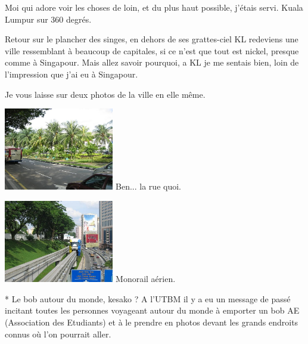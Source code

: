 \begin{multicols}{2}
Moi qui adore voir les choses de loin, et du plus haut possible, j'étais servi. Kuala Lumpur sur 360 degrés.

Retour sur le plancher des singes, en dehors de ses grattes-ciel KL redeviens une ville ressemblant à beaucoup de capitales, si ce n'est que tout est nickel, presque comme à Singapour. Mais allez savoir pourquoi, a KL je me sentais bien, loin de l'impression que j'ai eu à Singapour.

Je vous laisse sur deux photos de la ville en elle même.

\hspace*{-0.65cm}
\includegraphics[width=4.8cm]{articles/Kuala-lumpur/1211016874hbIL.jpg}
Ben... la rue quoi.

\hspace*{-0.65cm}
\includegraphics[width=4.8cm]{articles/Kuala-lumpur/1211017229ryCi.jpg}
Monorail aérien.

\end{multicols}

 * Le bob autour du monde, kesako ? A l'UTBM il y a eu un message de passé incitant toutes les personnes voyageant autour du monde à emporter un bob AE (Association des Etudiants) et à le prendre en photos devant les grands endroits connus où l'on pourrait aller.


